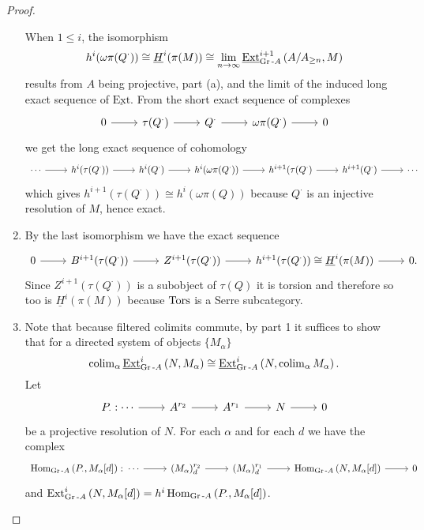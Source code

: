 \documentclass[dissertation.tex]{subfiles}
\begin{document}
\begin{prop}
\begin{proof}
\begin{enumerate}
      When $1 \leq i$, the isomorphism 
      $$h^i(\omega\pi(Q^\cdot)) \cong \underline{H}^i(\pi(M)) \cong \lim_{n \rightarrow \infty}\operatorname{\underline{Ext}}^{i+1}_{\operatorname{Gr}\text{-}A}\left(A/A_{\geq n}, M\right)$$ 
      results from $A$ being projective, part (a), and the limit of the induced long exact sequence of $\operatorname{\underline{Ext}}$.
      From the short exact sequence of complexes
      $$\begin{tikzcd}
        0 \arrow{r} & \tau(Q^\cdot) \arrow{r} & Q^\cdot \arrow{r} & \omega\pi(Q^\cdot) \arrow{r} & 0
      \end{tikzcd}$$
      we get the long exact sequence of cohomology
      $$\begin{tikzcd}
        \cdots \arrow{r} & h^i(\tau(Q^\cdot)) \arrow{r} & h^i(Q^\cdot) \arrow{r} & h^i(\omega\pi(Q^\cdot)) \arrow{r} & h^{i+1}(\tau(Q^\cdot) \arrow{r} & h^{i+1}(Q^\cdot) \arrow{r} & \cdots
      \end{tikzcd}$$
      which gives $h^{i+1}(\tau(Q^\cdot)) \cong h^i(\omega\pi(Q))$ because $Q^\cdot$ is an injective resolution of $M$, hence exact.
    \item
      By the last isomorphism we have the exact sequence
      $$\begin{tikzcd}
        0 \arrow{r} & B^{i+1}(\tau(Q^\cdot)) \arrow{r} & Z^{i + 1} (\tau(Q^\cdot)) \arrow{r} & h^{i+1}(\tau(Q^\cdot)) \cong \underline{H}^i(\pi(M)) \arrow{r} & 0.
      \end{tikzcd}$$
      Since $Z^{i+1}(\tau(Q^\cdot))$ is a subobject of $\tau(Q)$ it is torsion and therefore so too is $\underline{H}^i(\pi(M))$ because $\operatorname{Tors}$ is a Serre subcategory.
    \item
      Note that because filtered colimits commute, by part 1 it suffices to show that for a directed system of objects $\{M_\alpha\}$
      $$\operatorname{colim}_{\alpha}\operatorname{\underline{Ext}}^{i}_{\operatorname{Gr}\text{-}A}\left(N,M_\alpha\right) \cong \operatorname{\underline{Ext}}^{i}_{\operatorname{Gr}\text{-}A}\left(N,\operatorname{colim}_{\alpha} M_\alpha\right).$$
      Let 
      $$\begin{tikzcd}
        P_\cdot : \cdots \arrow{r} & A^{r_2} \arrow{r} & A^{r_1} \arrow{r} & N \arrow{r} & 0
      \end{tikzcd}$$
      be a projective resolution of $N$.
      For each $\alpha$ and for each $d$ we have the complex
      $$\begin{tikzcd}
        \Hom{\Gr{A}}{P_\cdot, M_\alpha[d]} \colon \cdots \arrow{r} & (M_\alpha)_d^{r_2} \arrow{r} & (M_\alpha)_d^{r_1} \arrow{r} & \Hom{\Gr{A}}{N, M_\alpha[d]} \arrow{r} & 0
      \end{tikzcd}$$
      and $\operatorname{Ext}^{i}_{\operatorname{Gr}\text{-}A}\left(N, M_\alpha[d]\right) = h^i\operatorname{Hom}_{\operatorname{Gr}\text{-}A}\left(P_\cdot, M_\alpha[d]\right)$.

\end{enumerate}
\end{proof}
\end{prop}
\end{document}

